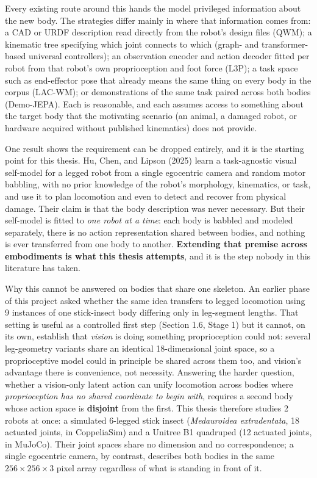 \documentclass[12pt,a4paper,oneside]{report}
\begin{document}
\newpage

Every existing route around this hands the model privileged information about the new body. The
strategies differ mainly in where that information comes from: a CAD or URDF description read directly from the
robot's design files (QWM); a kinematic tree specifying which joint connects to which (graph- and
transformer-based universal controllers); an observation encoder and action decoder fitted per robot from that
robot's own proprioception and foot force (L3P); a task space such as end-effector pose that already means the
same thing on every body in the corpus (LAC-WM); or demonstrations of the same task paired across both bodies
(Demo-JEPA). Each is reasonable, and each assumes access to something about the target body that the motivating
scenario (an animal, a damaged robot, or hardware acquired without published kinematics) does not provide.

One result shows the requirement can be dropped entirely, and it is the starting point for this thesis.
Hu, Chen, and Lipson (2025) learn a task-agnostic visual self-model for a legged robot from a single egocentric
camera and random motor babbling, with no prior knowledge of the robot's morphology, kinematics, or task, and use
it to plan locomotion and even to detect and recover from physical damage. Their claim is that the body
description was never necessary. But their self-model is fitted to \emph{one robot at a time}: each body is
babbled and modeled separately, there is no action representation shared between bodies, and nothing is ever
transferred from one body to another. \textbf{Extending that premise across embodiments is what this thesis
attempts}, and it is the step nobody in this literature has taken.

Why this cannot be answered on bodies that share one skeleton. An earlier phase of this project asked
whether the same idea transfers to legged locomotion using 9 instances of one stick-insect body differing only
in leg-segment lengths. That setting is useful as a controlled first step (Section 1.6, Stage 1) but it cannot, on its own,
establish that \emph{vision} is doing something proprioception could not: several leg-geometry variants share an identical
18-dimensional joint space, so a proprioceptive model could in principle be shared across them too, and vision's
advantage there is convenience, not necessity. Answering the harder question, whether a vision-only latent action
can unify locomotion across bodies where \emph{proprioception has no shared coordinate to begin with}, requires a
second body whose action space is \textbf{disjoint} from the first. This thesis therefore studies 2
robots at once: a simulated 6-legged stick insect (\emph{Medauroidea extradentata}, 18 actuated joints, in
CoppeliaSim) and a Unitree B1 quadruped (12 actuated joints, in MuJoCo). Their joint spaces share no dimension and
no correspondence; a single egocentric camera, by contrast, describes both bodies in the same
$256\times256\times3$ pixel array regardless of what is standing in front of it.
\end{document}
